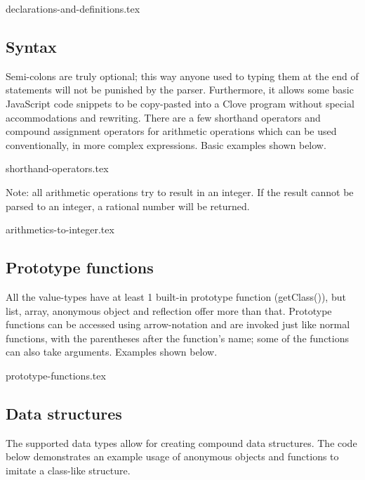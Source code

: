 \documentclass[12pt,a4paper]{article}
\begin{document}
{declarations-and-definitions.tex}





\vspace{-1.75em}
\subsection*{Syntax}
Semi-colons are truly optional; this way anyone used to typing them at the end of statements will not be punished by the parser. Furthermore, it allows some basic JavaScript code snippets to be copy-pasted into a Clove program without special accommodations and rewriting. There are a few shorthand operators and compound assignment operators for arithmetic operations which can be used conventionally, in more complex expressions. Basic examples shown below.\par

{shorthand-operators.tex}

\vspace{-1em}
\noindent Note: all arithmetic operations try to result in an integer. If the result cannot be parsed to an integer, a rational number will be returned.

{arithmetics-to-integer.tex}





\subsection*{Prototype functions}
All the value-types have at least 1 built-in prototype function (getClass()), but list, array, anonymous object and reflection offer more than that. Prototype functions can be accessed using arrow-notation and are invoked just like normal functions, with the parentheses after the function's name; some of the functions can also take arguments. Examples shown below.

{prototype-functions.tex}





\vspace{-1.75em}
\subsection*{Data structures}
The supported data types allow for creating compound data structures. The code below demonstrates an example usage of anonymous objects and functions to imitate a class-like structure.
\end{document}
